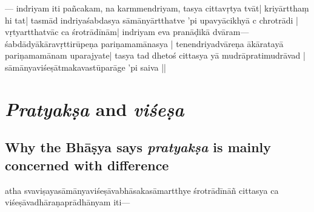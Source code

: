 ---%
indriyam iti \mde {} 
pañcakam, na karmme\-ndriyam, tasya cittavṛtya%
\mds tvāt| 
%
kriyārtthaṃ hi tat| 
tasmād indriya\-śabdasya sā\-māny\mde ārtthatve ’pi  %
upa\mds vyācikhyā\mde {}%
c chrotrādi%
| vṛtyartthatvāc ca śrotrādī\mds nām| %
indriyam eva pranāḍikā dvāram---%
śabdādyā\mde kāra\-vṛttirūpeṇa pariṇamam\mds ānasya | 
tenendriyadvāre\-ṇa ā\mds kāratayā pariṇamamā\mde nam upa\-ra\-jyate| 
tasya tad\- dhetoś cittasya yā %
mudrā\mds pratimudrāvad | sāmānya\-vi\-śeṣātmaka\-va\mde stūparāge 'pi 
 saiva ||%

\section{\emph{Pratyakṣa} and \emph{viśeṣa}}
\subsection{Why the Bhāṣya says \emph{pratyakṣa} is mainly concerned with difference}
atha svaviṣayasāmānyaviśeṣāvabhāsakasāma\mde rtthye śrotrādīnāñ cittasya ca 
viśeṣāvadhāra\mds ṇaprādhānyam iti---

